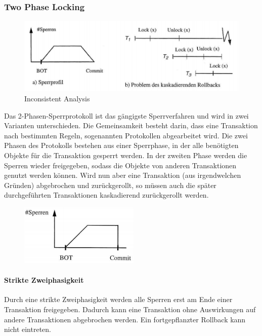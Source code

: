 \subsubsection{Two Phase Locking}
\begin{figure}[H]
\centering
    \includegraphics[width=.75\textwidth]{Content/images/gleichzeitigkeit/twophaselocking.png}
    \caption{Inconsistent Analysis}
\end{figure}
\noindent
Das 2-Phasen-Sperrprotokoll ist das gängigste Sperrverfahren und wird in zwei Varianten unterschieden. Die Gemeinsamkeit besteht darin, dass eine Transaktion nach bestimmten Regeln, sogenannten Protokollen abgearbeitet wird.
Die zwei Phasen des Protokolls bestehen aus einer Sperrphase, in der alle benötigten Objekte für die Transaktion gesperrt werden. In der zweiten Phase werden die Sperren wieder freigegeben, sodass die Objekte von anderen Transaktionen genutzt werden können.  
\newline
\newline
Wird nun aber eine Transaktion  (aus irgendwelchen Gründen) abgebrochen und zurückgerollt, so müssen auch die später durchgeführten Transaktionen kaskadierend zurückgerollt werden.

\begin{minipage}{0.4\textwidth}
\begin{figure}[H]
\includegraphics{Content/images/gleichzeitigkeit/striktezweiphasigkeit.png}
\end{figure}
\end{minipage} \hfill
\begin{minipage}{0.55\textwidth}
\paragraph{Strikte Zweiphasigkeit}
Durch eine strikte Zweiphasigkeit werden alle Sperren erst am Ende einer Transaktion freigegeben. Dadurch kann eine Transaktion ohne Auswirkungen auf andere Transaktionen abgebrochen werden. Ein fortgepflanzter Rollback kann nicht eintreten.
\end{minipage}

